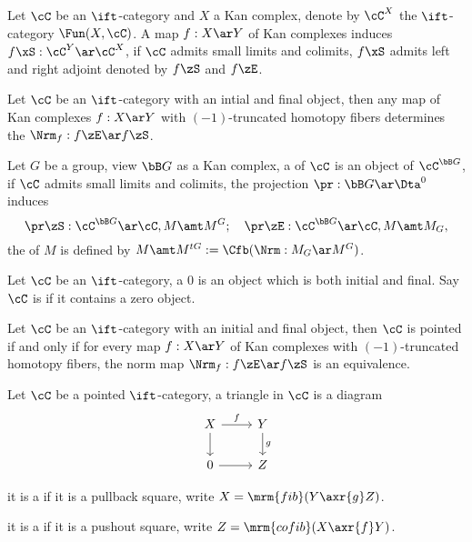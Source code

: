 \documentclass[article, a4paper, twoside]{universal}
\begin{document}
\begin{dfn}[6.1.6.1, 6.1.6.4]
    Let $\cC$ be an $\ift$-category and $X$ a Kan complex, denote by $\cC^{X}$ the $\ift$-category $\Fun(X,\cC)$. A map $f:X\ar Y$ of Kan complexes induces $f\xS:\cC^{Y}\ar\cC^{X}$, if $\cC$ admits small limits and colimits, $f\xS$ admits left and right adjoint denoted by $f\zS$ and $f\zE$.

    Let $\cC$ be an $\ift$-category with an intial and final object, then any map of Kan complexes $f:X\ar Y$ with $(-1)$-truncated homotopy fibers determines the  $\Nrm_{f}:f\zE\ar f\zS$.
\end{dfn}

\begin{dfn}[6.1.6.2, 6.1.6.24]
    Let $G$ be a group, view $\bB G$ as a Kan complex, a  of $\cC$ is an object of $\cC^{\bB G}$, if $\cC$ admits small limits and colimits, the projection $\pr:\bB G\ar\Dta^{0}$ induces
    \[
        \pr\zS:\cC^{\bB G}\ar\cC, M\amt M^{G};\quad \pr\zE:\cC^{\bB G}\ar\cC, M\amt M_{G},
    \]
    the  of $M$ is defined by $M\amt M^{tG}:=\Cfb(\Nrm:M_{G}\ar M^{G})$.
\end{dfn}

\begin{dfn}[1.1.1.1]
    Let $\cC$ be an $\ift$-category, a  $0$ is an object which is both initial and final. Say $\cC$ is  if it contains a zero object.
\end{dfn}

\begin{thm}[6.1.6.7]
    Let $\cC$ be an $\ift$-category with an initial and final object, then $\cC$ is pointed if and only if for every map $f:X\ar Y$ of Kan complexes with $(-1)$-truncated homotopy fibers, the norm map $\Nrm_{f}:f\zE\ar f\zS$ is an equivalence.
\end{thm}

\begin{dfn}[1.1.1.4]
    Let $\cC$ be a pointed $\ift$-category, a triangle in $\cC$ is a diagram
    \[
        \begin{tikzcd}
            X\ar[r, "f"]\ar[d] & Y\ar[d, "g"] \\
            0 \ar[r] & Z
        \end{tikzcd}
    \]
    \begin{itm}
        \item it is a  if it is a pullback square, write $X=\mrm{fib}(Y\axr{g}Z)$.
        \item it is a  if it is a pushout square, write $Z=\mrm{cofib}(X\axr{f}Y)$.
    \end{itm}
\end{dfn}
\end{document}
